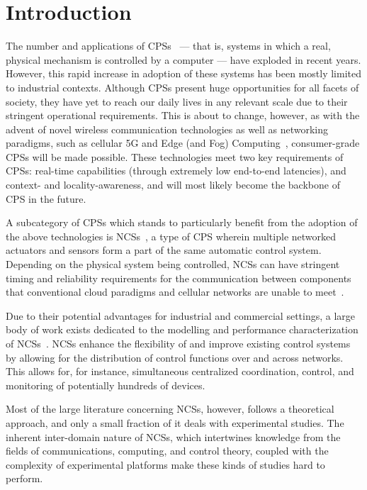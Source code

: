 \section{Introduction}\label{sec:intro}

The number and applications of \acp{CPS}~\cite{Rajkumar2010CPS} --- that is, systems in which a real, physical mechanism is controlled by a computer --- have exploded in recent years.
However, this rapid increase in adoption of these systems has been mostly limited to industrial contexts.
Although \acp{CPS} present huge opportunities for all facets of society, they have yet to reach our daily lives in any relevant scale due to their stringent operational requirements.
This is about to change, however, as with the advent of novel wireless communication technologies as well as networking paradigms, such as cellular 5G and Edge (and Fog) Computing~\cite{Satya2017Emergence}, consumer-grade \acp{CPS} will be made possible.
These technologies meet two key requirements of \acp{CPS}: real-time capabilities (through extremely low end-to-end latencies), and context- and locality-awareness, and will most likely become the backbone of \ac{CPS} in the future.

A subcategory of \acp{CPS} which stands to particularly benefit from the adoption of the above technologies is \acp{NCS}~\cite{Gupta2010NCSOverview}, a type of \ac{CPS} wherein multiple networked actuators and sensors form a part of the same automatic control system.
Depending on the physical system being controlled, \acp{NCS} can have stringent timing and reliability requirements for the communication between components that conventional cloud paradigms and cellular networks are unable to meet~\cite{Liu2017Review,Wan2020Efficient}.

Due to their potential advantages for industrial and commercial settings, a large body of work exists dedicated to the modelling and performance characterization of \aclp{NCS}~\cite{Zhang2013Survey,Zhang2016Survey}.
\Acp{NCS} enhance the flexibility of and improve existing control systems by allowing for the distribution of control functions over and across networks.
This allows for, for instance, simultaneous centralized coordination, control, and monitoring of potentially hundreds of devices.

Most of the large literature concerning \acp{NCS}, however, follows a theoretical approach, and only a small fraction of it deals with experimental studies.
The inherent inter-domain nature of \acp{NCS}, which intertwines knowledge from the fields of communications, computing, and control theory, coupled with the complexity of experimental platforms make these kinds of studies hard to perform.

